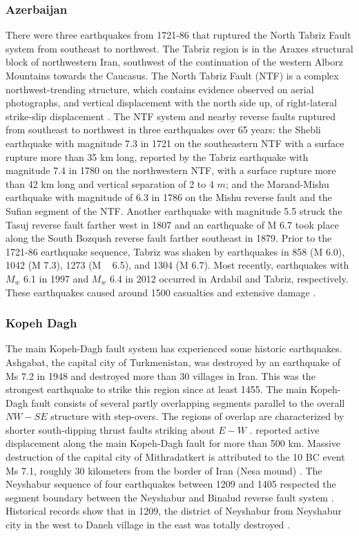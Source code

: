 \subsubsection{Azerbaijan}
There were three earthquakes from 1721-86 that ruptured the North Tabriz Fault system from southeast to northwest. The Tabriz region is in the Araxes structural block of northwestern Iran, southwest of the continuation of the western Alborz Mountains towards the Caucasus. The North Tabriz Fault (NTF) is a complex northwest-trending structure, which contains evidence observed on aerial photographs, and vertical displacement with the north side up, of right-lateral strike-slip displacement \citep{Berberian1999}.
The NTF system and nearby reverse faults ruptured from southeast to northwest in three earthquakes over 65 years: the Shebli earthquake with magnitude 7.3 in 1721 on the southeastern NTF with a surface rupture more than 35 km long, reported by \citet{Jones1834} the Tabriz earthquake with magnitude 7.4 in 1780 on the northwestern NTF, with a surface rupture more than 42 km long and vertical separation of 2 to 4 $m$; and the Marand-Mishu earthquake with magnitude of 6.3 in 1786 on the Mishu reverse fault and the Sufian segment of the NTF. Another earthquake with  magnitude 5.5 struck the Tasuj reverse fault farther west in 1807 and an earthquake of M 6.7 took place along the South Bozqush reverse fault farther southeast in 1879. Prior to the 1721-86 earthquake sequence, Tabriz was shaken by earthquakes in 858 (M 6.0), 1042 (M 7.3), 1273 (M ~ 6.5), and 1304 (M 6.7)\citep{Berberian1999}. Most recently, earthquakes with $M_w$ 6.1 in 1997 and $M_w$ 6.4 in 2012 occurred in Ardabil and Tabriz, respectively. These earthquakes caused around 1500 casualties and extensive damage \citep{USGS_ardabil,USGS_tabriz}.\\


\subsubsection{Kopeh Dagh}
The main Kopeh-Dagh fault system has experienced some historic earthquakes. Ashgabat, the capital city of Turkmenistan, was destroyed by an earthquake of Ms 7.2 in 1948 and destroyed more than 30 villages in Iran. This was the strongest earthquake to strike this region since at least 1455.
The main Kopeh-Dagh fault consists of several partly overlapping segments parallel to the overall $NW - SE$ structure with step-overs. The regions of overlap are characterized by shorter south-dipping thrust faults striking about $E - W$ \citep{Berberian2001}. \citet{Trifonov1978} reported active displacement along the main Kopeh-Dagh fault for more than 500 km. 
Massive destruction of the capital city of Mithradatkert is attributed to the 10 BC event Ms 7.1, roughly 30 kilometers from the border of Iran (Nesa mound) \citep{Berberian2001}.
The Neyshabur sequence of four earthquakes between 1209 and 1405 respected the segment boundary between the Neyshabur and Binalud reverse fault system \citep{Berberian1999}.
Historical records show that in 1209, the district of Neyshabur from Neyshabur city in the west to Daneh village in the east was totally destroyed \citep{Berberian1999}.\\



